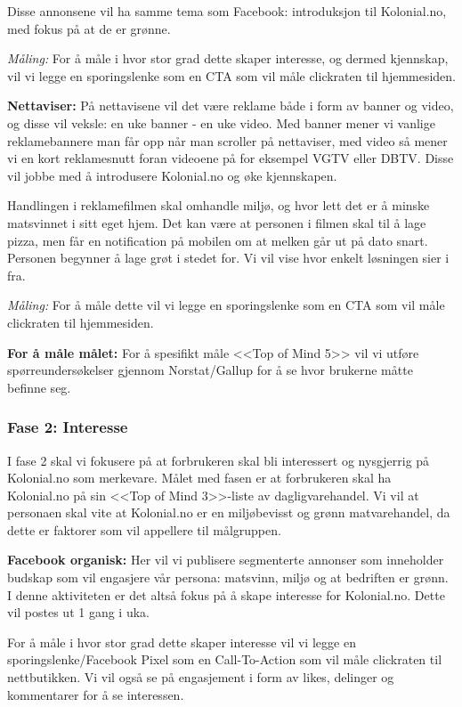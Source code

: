 Disse annonsene vil ha samme tema som Facebook: introduksjon til Kolonial.no, med fokus på at de er grønne. 

\textit{Måling:} For å måle i hvor stor grad dette skaper interesse, og dermed kjennskap, vil vi legge en sporingslenke som en CTA som vil måle clickraten til hjemmesiden. 

\textbf{Nettaviser:} På nettavisene vil det være reklame både i form av banner og video, og disse vil veksle: en uke banner - en uke video. Med banner mener vi vanlige reklamebannere man får opp når man scroller på nettaviser, med video så mener vi en kort reklamesnutt foran videoene på for eksempel VGTV eller DBTV. Disse vil jobbe med å introdusere Kolonial.no og øke kjennskapen. 

Handlingen i reklamefilmen skal omhandle miljø, og hvor lett det er å minske matsvinnet i sitt eget hjem. Det kan være at personen i filmen skal til å lage pizza, men får en notification på mobilen om at melken går ut på dato snart. Personen begynner å lage grøt i stedet for. Vi vil vise hvor enkelt løsningen sier i fra. 

\textit{Måling:} For å måle dette vil vi legge en sporingslenke som en CTA som vil måle clickraten til hjemmesiden. 

\textbf{For å måle målet:} For å spesifikt måle <<Top of Mind 5>> vil vi utføre spørreundersøkelser gjennom Norstat/Gallup for å se hvor brukerne måtte befinne seg.

\subsubsection{\textbf{Fase 2: Interesse}}
I fase 2 skal vi fokusere på at forbrukeren skal bli interessert og nysgjerrig på Kolonial.no som merkevare. Målet med fasen er at forbrukeren skal ha Kolonial.no på sin <<Top of Mind 3>>-liste av dagligvarehandel. Vi vil at personaen skal vite at Kolonial.no er en miljøbevisst og grønn matvarehandel, da dette er faktorer som vil appellere til målgruppen. 

\textbf{Facebook organisk:} Her vil vi publisere segmenterte annonser som inneholder budskap som vil engasjere vår persona: matsvinn, miljø og at bedriften er grønn. I denne aktiviteten er det altså fokus på å skape interesse for Kolonial.no. Dette vil postes ut 1 gang i uka. 

For å måle i hvor stor grad dette skaper interesse vil vi legge en sporingslenke/Facebook Pixel som en Call-To-Action som vil måle clickraten til nettbutikken. Vi vil også se på engasjement i form av likes, delinger og kommentarer for å se interessen.

